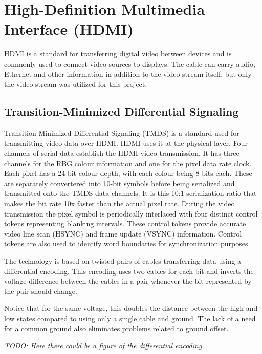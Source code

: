 \section{High-Definition Multimedia Interface (HDMI)}
HDMI is a standard for transferring digital video between devices and is commonly used to connect video sources to displays.
The cable can carry audio, Ethernet and other information in addition to the video stream itself, but only the video stream was utilized for this project.

\subsection{Transition-Minimized Differential Signaling}
Transition-Minimized Differential Signaling (TMDS) is a standard used for transmitting video data over HDMI.
HDMI uses it at the physical layer.
Four channels of serial data establish the HDMI video transmission.
It has three channels for the RBG colour information and one for the pixel data rate clock.
Each pixel has a 24-bit colour depth, with each colour being 8 bits each.
These are separately convertered into 10-bit symbols before being serialized and transmitted onto the TMDS data channels.
It is this 10:1 serialization ratio that makes the bit rate 10x faster than the actual pixel rate.
During the video transmission the pixel symbol is periodically interlaced with four distinct control tokens representing blanking intervals.
These control tokens provide accurate video line scan (HSYNC) and frame update (VSYNC) information.
Control tokens are also used to identify word boundaries for synchronization purposes.

The technology is based on twisted pairs of cables transferring data using a differential encoding.
This encoding uses two cables for each bit and inverts the voltage difference between the cables in a pair whenever the bit represented by the pair should change.

Notice that for the same voltage, this doubles the distance between the high and low states compared to using only a single cable and ground.
The lack of a need for a common ground also eliminates problems related to ground offset.

\emph{TODO: Here there could be a figure of the differential encoding}

